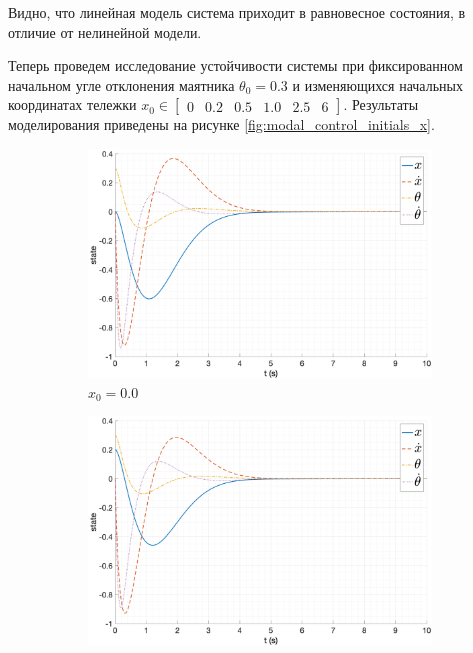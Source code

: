 \FloatBarrier
Видно, что линейная модель система приходит в равновесное состояния, в отличие от нелинейной модели.

Теперь проведем исследование устойчивости системы при фиксированном начальном угле отклонения маятника $\theta_0 = 0.3$ и 
изменяющихся начальных координатах тележки $x_0 \in \begin{bmatrix}0 & 0.2 & 0.5 & 1.0 & 2.5 & 6\end{bmatrix}$. Результаты 
моделирования приведены на рисунке \ref{fig:modal_control_initials_x}.
\begin{figure}[ht!]
    \centering
    \begin{subfigure}[b]{0.45\textwidth}
        \includegraphics[width=\textwidth]{media/plots/modal_control_initials/state_1.png}
        \caption{$x_0 = 0.0$}
    \end{subfigure}
    \begin{subfigure}[b]{0.45\textwidth}
        \includegraphics[width=\textwidth]{media/plots/modal_control_initials/state_2.png}

\end{subfigure}
\end{figure}

